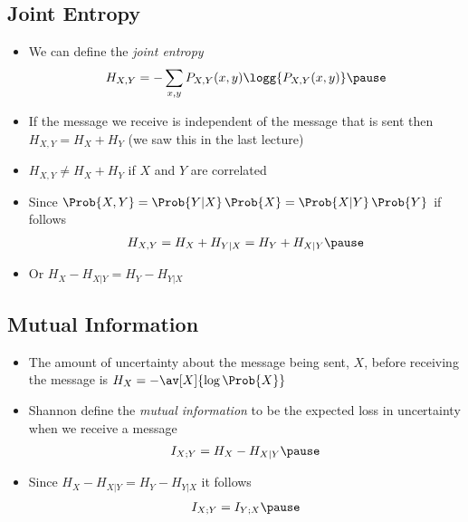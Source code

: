 \begin{slide}
\section[-1]{Joint Entropy}

\begin{PauseHighLight}
  \begin{itemize}
  \item We can define the \emph{joint entropy}
    \begin{align*}
      H_{X,Y} = - \sum_{x,y} P_{X,Y}(x,y) \logg{P_{X,Y}(x,y)}\pause
    \end{align*}
  \item If the message we receive is independent of the message that
    is sent then $H_{X,Y} = H_X + H_Y$ (we saw this in the last
    lecture)\pause
  \item $H_{X,Y} \neq H_X + H_Y$ if $X$ and $Y$ are correlated\pause
  \item Since $\Prob{X,Y} = \Prob{Y|X}\,\Prob{X} =
    \Prob{X|Y}\,\Prob{Y}$ if follows
    \begin{align*}
      H_{X,Y} = H_{X} + H_{Y|X} = H_{Y} + H_{X|Y}\pause
    \end{align*}
  \item Or $H_{X} - H_{X|Y} = H_{Y} - H_{Y|X}$\pause
  \end{itemize}
\end{PauseHighLight}

\end{slide}



\begin{slide}
\section{Mutual Information}

\begin{PauseHighLight}
  \begin{itemize}
  \item The amount of uncertainty about the message being sent, $X$,
    before receiving the message is
    $H_X=-\av[X]{\log{\Prob{X}}}$\pause
  \item Shannon define the \textit{mutual information} to be the expected loss
    in uncertainty when we receive a message
    \begin{align*}
      I_{X;Y} = H_X - H_{X|Y}\pause
    \end{align*}
  \item Since $H_{X} - H_{X|Y} = H_{Y} - H_{Y|X}$ it follows
    \begin{align*}
      I_{X; Y} = I_{Y; X}\pause
    \end{align*}
  \end{itemize}
\end{PauseHighLight}
\end{slide}

